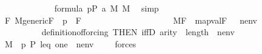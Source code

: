 \begin{isabellebody}
\ \ \ \ \ \ \ \ \ \ \isamarkupfalse%
\ \ {\isacartoucheopen}{\isacharquery}{\kern0pt}{\isasymchi}{\isasymin}formula{\isacartoucheclose}\ {\isacartoucheopen}p{\isasymin}P{\isacartoucheclose}\ a{}\ {\isacartoucheopen}{\isasymtheta}{\isasymin}M{\isacartoucheclose}\ {\isacartoucheopen}{\isasympi}{\isasymin}M{\isacartoucheclose}\ \isamarkupfalse%
\ simp\isanewline
\ \ \ \ \ \ \isamarkupfalse%
\isanewline
\ \ \ \ \ \ \ \ \isamarkupfalse%
\ {\isachardoublequoteopen}{\isasymforall}F{\isachardot}{\kern0pt}\ M{\isacharunderscore}{\kern0pt}generic{\isacharparenleft}{\kern0pt}F{\isacharparenright}{\kern0pt}\ {\isasymand}\ p\ {\isasymin}\ F\ {\isasymlongrightarrow}\ \isanewline
\ \ \ \ \ \ \ \ \ \ \ \ \ \ \ \ \ \ \ M{\isacharbrackleft}{\kern0pt}F{\isacharbrackright}{\kern0pt}{\isacharcomma}{\kern0pt}\ \ map{\isacharparenleft}{\kern0pt}val{\isacharparenleft}{\kern0pt}F{\isacharparenright}{\kern0pt}{\isacharcomma}{\kern0pt}\ {\isacharbrackleft}{\kern0pt}{\isasymtheta}{\isacharbrackright}{\kern0pt}\ {\isacharat}{\kern0pt}\ nenv\ {\isacharat}{\kern0pt}{\isacharbrackleft}{\kern0pt}{\isasympi}{\isacharbrackright}{\kern0pt}{\isacharparenright}{\kern0pt}\ {\isasymTurnstile}\ \ {\isacharquery}{\kern0pt}{\isasymchi}{\isachardoublequoteclose}\isanewline
\ \ \ \ \ \ \ \ \isamarkupfalse%
\ definition{\isacharunderscore}{\kern0pt}of{\isacharunderscore}{\kern0pt}forcing\ {\isacharbrackleft}{\kern0pt}THEN\ iffD{}{\isacharbrackright}{\kern0pt}\ {\isacartoucheopen}arity{\isacharparenleft}{\kern0pt}{\isacharquery}{\kern0pt}{\isasymchi}{\isacharparenright}{\kern0pt}\ {\isasymle}\ length{\isacharparenleft}{\kern0pt}{\isacharbrackleft}{\kern0pt}{\isasymtheta}{\isacharbrackright}{\kern0pt}\ {\isacharat}{\kern0pt}\ nenv\ {\isacharat}{\kern0pt}\ {\isacharbrackleft}{\kern0pt}{\isasympi}{\isacharbrackright}{\kern0pt}{\isacharparenright}{\kern0pt}{\isacartoucheclose}\isanewline
\ \ \ \ \ \ \ \ \isamarkupfalse%
\ {\isachardoublequoteopen}M{\isacharcomma}{\kern0pt}\ \ {\isacharbrackleft}{\kern0pt}p{\isacharcomma}{\kern0pt}\ P{\isacharcomma}{\kern0pt}\ leq{\isacharcomma}{\kern0pt}\ one{\isacharcomma}{\kern0pt}{\isasymtheta}{\isacharbrackright}{\kern0pt}\ {\isacharat}{\kern0pt}\ nenv\ {\isacharat}{\kern0pt}\ {\isacharbrackleft}{\kern0pt}{\isasympi}{\isacharbrackright}{\kern0pt}\ {\isasymTurnstile}\ \ forces{\isacharparenleft}{\kern0pt}{\isacharquery}{\kern0pt}{\isasymchi}{\isacharparenright}{\kern0pt}{\isachardoublequoteclose}\isanewline
\ \ \ \ \ \ \ \ \ \ \isamarkupfalse%

\end{isabellebody}
